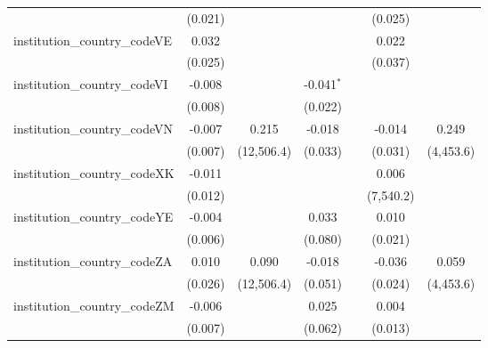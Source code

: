 \begin{tabular}{lcccccc}
                                         & (0.021)        &               &               &               & (0.025)       &   \\   
   institution\_country\_codeVE          & 0.032          &               &               &               & 0.022         &   \\   
                                         & (0.025)        &               &               &               & (0.037)       &   \\   
   institution\_country\_codeVI          & -0.008         &               & -0.041$^{*}$  &               &               &   \\   
                                         & (0.008)        &               & (0.022)       &               &               &   \\   
   institution\_country\_codeVN          & -0.007         & 0.215         & -0.018        &               & -0.014        & 0.249\\   
                                         & (0.007)        & (12,506.4)    & (0.033)       &               & (0.031)       & (4,453.6)\\   
   institution\_country\_codeXK          & -0.011         &               &               &               & 0.006         &   \\   
                                         & (0.012)        &               &               &               & (7,540.2)     &   \\   
   institution\_country\_codeYE          & -0.004         &               & 0.033         &               & 0.010         &   \\   
                                         & (0.006)        &               & (0.080)       &               & (0.021)       &   \\   
   institution\_country\_codeZA          & 0.010          & 0.090         & -0.018        &               & -0.036        & 0.059\\   
                                         & (0.026)        & (12,506.4)    & (0.051)       &               & (0.024)       & (4,453.6)\\   
   institution\_country\_codeZM          & -0.006         &               & 0.025         &               & 0.004         &   \\   
                                         & (0.007)        &               & (0.062)       &               & (0.013)       &   \\   

\end{tabular}
